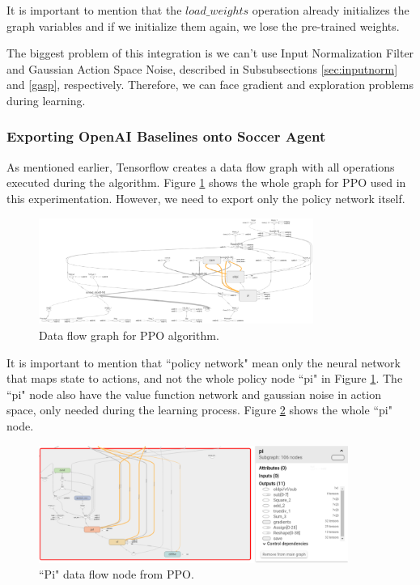 It is important to mention that the $load\_weights$ operation already initializes the graph variables and if we initialize them again, we lose the pre-trained weights.

The biggest problem of this integration is we can't use Input Normalization Filter and Gaussian Action Space Noise, described in Subsubsections \ref{sec:inputnorm} and \ref{gasp}, respectively. Therefore, we can face gradient and exploration problems during learning.

\subsubsection{Exporting OpenAI Baselines onto Soccer Agent}

As mentioned earlier, Tensorflow creates a data flow graph with all operations executed during the algorithm. Figure \ref{fig:dataflowgraph} shows the whole graph for PPO used in this experimentation. However, we need to export only the policy network itself.

\begin{figure}[!htbp]
	\centering
	\includegraphics[width=0.8\textwidth]{Cap5/dataflowgraph.eps}
	\caption{Data flow graph for PPO algorithm.
	}
	\label{fig:dataflowgraph}
\end{figure}

It is important to mention that ``policy network" mean only the neural network that maps state to actions, and not the whole policy node ``pi" in Figure \ref{fig:dataflowgraph}. The ``pi" node also have the value function network and gaussian noise in action space, only needed during the learning process. Figure \ref{fig:pigraph} shows the whole ``pi" node.

\begin{figure}[!htbp]
	\centering
	\includegraphics[width=0.9\textwidth]{Cap5/pigraph.eps}
	\caption{ ``Pi" data flow node from PPO.
	}
	\label{fig:pigraph}
\end{figure}

